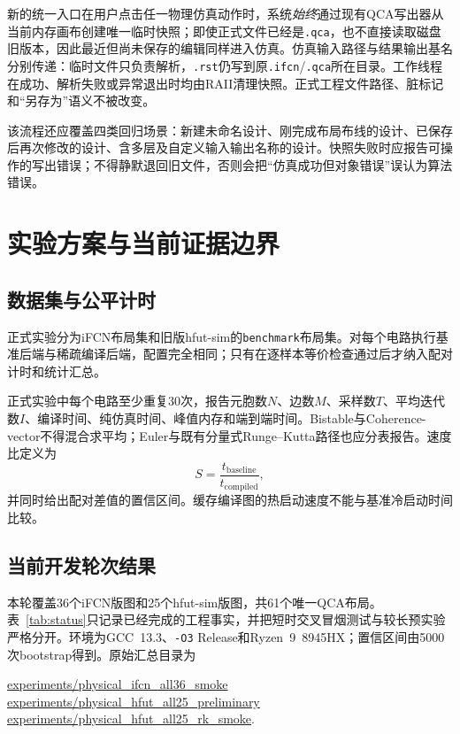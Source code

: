 \documentclass[UTF8,a4paper,11pt]{ctexart}
\begin{document}
新的统一入口在用户点击任一物理仿真动作时，系统\emph{始终}通过现有QCA写出器从当前内存画布创建唯一临时快照；即使正式文件已经是\texttt{.qca}，也不直接读取磁盘旧版本，因此最近但尚未保存的编辑同样进入仿真。仿真输入路径与结果输出基名分别传递：临时文件只负责解析，\texttt{.rst}仍写到原\texttt{.ifcn}/\texttt{.qca}所在目录。工作线程在成功、解析失败或异常退出时均由RAII清理快照。正式工程文件路径、脏标记和“另存为”语义不被改变。

该流程还应覆盖四类回归场景：新建未命名设计、刚完成布局布线的设计、已保存后再次修改的设计、含多层及自定义输入输出名称的设计。快照失败时应报告可操作的写出错误；不得静默退回旧文件，否则会把“仿真成功但对象错误”误认为算法错误。

\section{实验方案与当前证据边界}

\subsection{数据集与公平计时}

正式实验分为iFCN布局集和旧版hfut-sim的\texttt{benchmark}布局集。对每个电路执行基准后端与稀疏编译后端，配置完全相同；只有在逐样本等价检查通过后才纳入配对计时和统计汇总。

正式实验中每个电路至少重复30次，报告元胞数$N$、边数$M$、采样数$T$、平均迭代数$I$、编译时间、纯仿真时间、峰值内存和端到端时间。Bistable与Coherence-vector不得混合求平均；Euler与既有分量式Runge--Kutta路径也应分表报告。速度比定义为
\begin{equation}
 S=\frac{t_{\mathrm{baseline}}}{t_{\mathrm{compiled}}},
\end{equation}
并同时给出配对差值的置信区间。缓存编译图的热启动速度不能与基准冷启动时间比较。

\subsection{当前开发轮次结果}

本轮覆盖36个iFCN版图和25个hfut-sim版图，共61个唯一QCA布局。表~\ref{tab:status}只记录已经完成的工程事实，并把短时交叉冒烟测试与较长预实验严格分开。环境为GCC~13.3、\texttt{-O3} Release和Ryzen~9~8945HX；置信区间由5000次bootstrap得到。原始汇总目录为
\begin{center}\small
\url{experiments/physical_ifcn_all36_smoke}\\
\url{experiments/physical_hfut_all25_preliminary}\\
\url{experiments/physical_hfut_all25_rk_smoke}.
\end{center}
\end{document}
